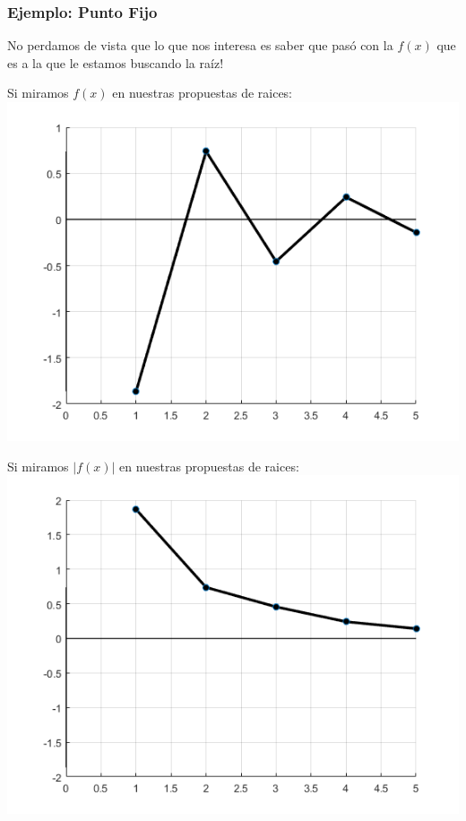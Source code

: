 \documentclass[xcolor=svgnames]{beamer} %
\theoremstyle{plain}
\theoremstyle{definition}
\begin{document}
\begin{frame}
\frametitle{Ejemplo: Punto Fijo}

No perdamos de vista que lo que nos interesa es saber que pasó con la $f(x)$ que es a la que le estamos buscando la raíz!\vspace{10pt}


\begin{minipage}{.45\linewidth}
Si miramos $f(x)$ en nuestras propuestas de raices:
\includegraphics[width=\linewidth]{fp_example/fEvals.png} 
\end{minipage}\hspace{6pt}\vline \hspace{6pt}\begin{minipage}{.45\linewidth}
Si miramos $|f(x)|$ en nuestras propuestas de raices:
\includegraphics[width=\linewidth]{fp_example/abs_fEvals.png} 
\end{minipage}


\end{frame}
\end{document}

